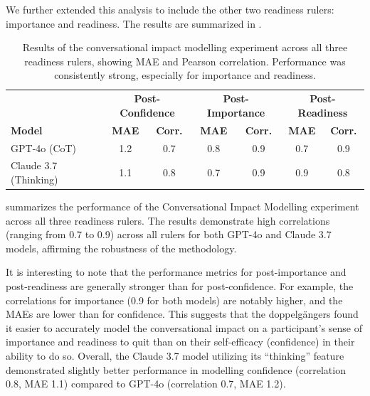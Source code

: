 We further extended this analysis to include the other two readiness rulers: importance and readiness. The results are summarized in .




\begin{table}[!ht]
	\centering
	\begin{tabular}{l|cc|cc|cc}
		\toprule
		                      & \multicolumn{2}{c|}{\textbf{Post-Confidence}} & \multicolumn{2}{c|}{\textbf{Post-Importance}} & \multicolumn{2}{c}{\textbf{Post-Readiness}}                                                  \\
		\textbf{Model}        & \textbf{MAE}                                  & \textbf{Corr.}                                & \textbf{MAE}                                & \textbf{Corr.} & \textbf{MAE} & \textbf{Corr.} \\
		\midrule
		GPT-4o (CoT)          & 1.2                                           & 0.7                                           & 0.8                                         & 0.9            & 0.7          & 0.9            \\
		Claude 3.7 (Thinking) & 1.1                                           & 0.8                                           & 0.7                                         & 0.9            & 0.9          & 0.8            \\ \hline
	\end{tabular}
	\caption[Multi-ruler conversational impact modelling results]{Results of the conversational impact modelling experiment across all three readiness rulers, showing MAE and Pearson correlation. Performance was consistently strong, especially for importance and readiness.}
	\label{tab:autoplay_results_full}
\end{table}

 summarizes the performance of the Conversational Impact Modelling experiment across all three readiness rulers. The results demonstrate high correlations (ranging from 0.7 to 0.9) across all rulers for both GPT-4o and Claude 3.7 models, affirming the robustness of the methodology.

It is interesting to note that the performance metrics for post-importance and post-readiness are generally stronger than for post-confidence. For example, the correlations for importance (0.9 for both models) are notably higher, and the MAEs are lower than for confidence. This suggests that the doppelgängers found it easier to accurately model the conversational impact on a participant's sense of importance and readiness to quit than on their self-efficacy (confidence) in their ability to do so. Overall, the Claude 3.7 model utilizing its ``thinking'' feature demonstrated slightly better performance in modelling confidence (correlation 0.8, MAE 1.1) compared to GPT-4o (correlation 0.7, MAE 1.2).



